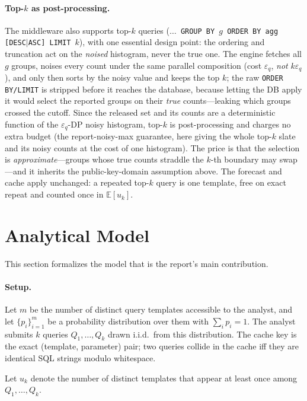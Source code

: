 \documentclass[sigconf,nonacm]{acmart}
\newcommand{\eps}{\varepsilon}
\newcommand{\E}{\mathbb{E}}
\begin{document}
\paragraph{Top-$k$ as post-processing.} The middleware also supports top-$k$ queries (\texttt{$\ldots$ GROUP BY $g$ ORDER BY agg [DESC$|$ASC] LIMIT $k$}), with one essential design point: the ordering and truncation act on the \emph{noised} histogram, never the true one. The engine fetches all $g$ groups, noises every count under the same parallel composition (cost $\eps_q$, \emph{not} $k\eps_q$), and only then sorts by the noisy value and keeps the top $k$; the raw \texttt{ORDER BY/LIMIT} is stripped before it reaches the database, because letting the DB apply it would select the reported groups on their \emph{true} counts---leaking which groups crossed the cutoff. Since the released set and its counts are a deterministic function of the $\eps_q$-DP noisy histogram, top-$k$ is post-processing and charges no extra budget (the report-noisy-max guarantee, here giving the whole top-$k$ slate and its noisy counts at the cost of one histogram). The price is that the selection is \emph{approximate}---groups whose true counts straddle the $k$-th boundary may swap---and it inherits the public-key-domain assumption above. The forecast and cache apply unchanged: a repeated top-$k$ query is one template, free on exact repeat and counted once in $\E[u_k]$.

\section{Analytical Model}
\label{sec:model}

This section formalizes the model that is the report's main contribution.

\paragraph{Setup.}
Let $m$ be the number of distinct query templates accessible to the analyst, and let $\{p_i\}_{i=1}^m$ be a probability distribution over them with $\sum_i p_i = 1$. The analyst submits $k$ queries $Q_1, \ldots, Q_k$ drawn i.i.d.\ from this distribution. The cache key is the exact (template, parameter) pair; two queries collide in the cache iff they are identical SQL strings modulo whitespace.

Let $u_k$ denote the number of distinct templates that appear at least once among $Q_1, \ldots, Q_k$.
\end{document}
